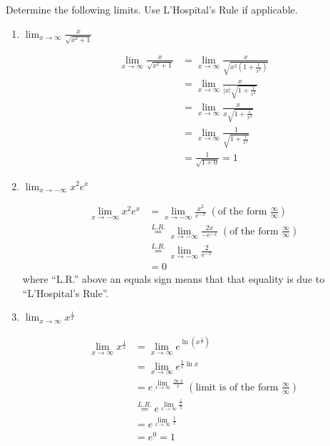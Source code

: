 \documentclass[nooutcomes]{ximera}
\begin{document}
\begin{problem}
Determine the following limits.  Use L'Hospital's Rule if applicable.
	\begin{enumerate}
	\item  $\lim_{x \to \infty} \frac{x}{\sqrt{x^2 + 1}}  $
		\begin{freeResponse}
			\begin{align*}
			\lim_{x \to \infty} \frac{x}{\sqrt{x^2 + 1}} &= \lim_{x \to \infty} \frac{x}{\sqrt{x^2 \left(1 + \frac{1}{x^2} \right)}} \\
			&=  \lim_{x \to \infty} \frac{x}{|x| \sqrt{1 + \frac{1}{x^2} }} \\
			&=  \lim_{x \to \infty} \frac{x}{x \sqrt{1 + \frac{1}{x^2} }} \\
			&=  \lim_{x \to \infty} \frac{1}{\sqrt{1 + \frac{1}{x^2} }} \\
			&= \frac{1}{\sqrt{1 + 0}} = 1
			\end{align*}
		\end{freeResponse}
		
		
		
	\item  $\lim_{x \to - \infty} x^2 e^x $
		\begin{freeResponse}
			\begin{align*}
			\lim_{x \to - \infty} x^2 e^x &= \lim_{x \to - \infty} \frac{x^2}{ e^{-x}} \; \left( \text{of the form } \frac{\infty}{\infty} \right) \\
			&\stackrel{L.R.}{=}  \lim_{x \to - \infty} \frac{2x}{- e^{-x}} \; \left( \text{of the form } \frac{\infty}{\infty} \right) \\
			&\stackrel{L.R.}{=}  \lim_{x \to - \infty} \frac{2}{ e^{-x}}  \\
			&= 0
			\end{align*}
where ``L.R.'' above an equals sign means that that equality is due to ``L'Hospital's Rule''.  
		\end{freeResponse}
		
		
		
	\item  $\lim_{x \to \infty} x^{\frac{1}{x}} $
		\begin{freeResponse}
			\begin{align*}
			\lim_{x \to \infty} x^{\frac{1}{x}} &= \lim_{x \to \infty} e^{\ln \left( x^{\frac{1}{x}} \right) } \\
			&= \lim_{x \to \infty} e^{\frac{1}{x} \ln x } \\
			&= e^{ \lim_{x \to \infty} \frac{\ln x}{x} } \; \left( \text{limit is of the form } \frac{\infty}{\infty} \right) \\
			&\stackrel{L.R.}{=} e^{\lim_{x \to \infty}\frac{\frac{1}{x}}{1}} \\
			&= e^{\lim_{x \to \infty} \frac{1}{x}} \\
			&= e^0 = 1
			\end{align*}
		\end{freeResponse}
		

\end{enumerate}
\end{problem}
\end{document}
